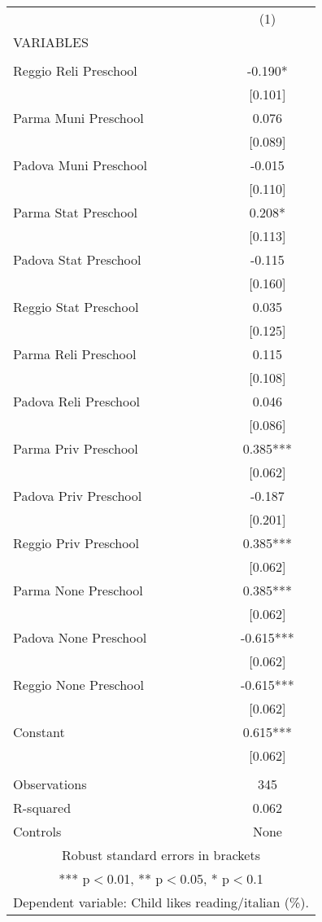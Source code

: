 \begin{tabular}{lc} \hline
 & (1) \\
VARIABLES &  \\ \hline
 &  \\
Reggio Reli Preschool & -0.190* \\
 & [0.101] \\
Parma Muni Preschool & 0.076 \\
 & [0.089] \\
Padova Muni Preschool & -0.015 \\
 & [0.110] \\
Parma Stat Preschool & 0.208* \\
 & [0.113] \\
Padova Stat Preschool & -0.115 \\
 & [0.160] \\
Reggio Stat Preschool & 0.035 \\
 & [0.125] \\
Parma Reli Preschool & 0.115 \\
 & [0.108] \\
Padova Reli Preschool & 0.046 \\
 & [0.086] \\
Parma Priv Preschool & 0.385*** \\
 & [0.062] \\
Padova Priv Preschool & -0.187 \\
 & [0.201] \\
Reggio Priv Preschool & 0.385*** \\
 & [0.062] \\
Parma None Preschool & 0.385*** \\
 & [0.062] \\
Padova None Preschool & -0.615*** \\
 & [0.062] \\
Reggio None Preschool & -0.615*** \\
 & [0.062] \\
Constant & 0.615*** \\
 & [0.062] \\
 &  \\
Observations & 345 \\
R-squared & 0.062 \\
 Controls & None \\ \hline
\multicolumn{2}{c}{ Robust standard errors in brackets} \\
\multicolumn{2}{c}{ *** p$<$0.01, ** p$<$0.05, * p$<$0.1} \\
\multicolumn{2}{c}{ Dependent variable: Child likes reading/italian (\%).} \\
\end{tabular}
